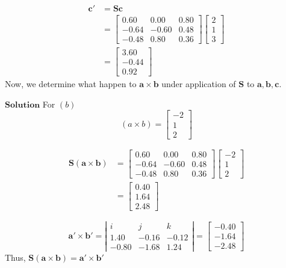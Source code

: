 $$
\begin{aligned}
\mathbf{c}' &=\mathbf{S} \mathbf{c} \\
&=\begin{bmatrix}
0.60 & 0.00 & 0.80 \\
-0.64 & -0.60 & 0.48 \\
-0.48 & 0.80 & 0.36
\end{bmatrix}\begin{bmatrix}
2 \\
1 \\
3
\end{bmatrix} \\
&=\begin{bmatrix}
3.60 \\
-0.44 \\
0.92
\end{bmatrix}
\end{aligned}
$$
Now, we determine what happen to $\mathbf{a} \times \mathbf{b}$ under application of $\mathbf{S}$ to $\mathbf{a}, \mathbf{b}, \mathbf{c}$.


$\boxed{\textbf{Solution}}$ For $(b)$
$$(a\times b)=\begin{bmatrix}
-2 \\
1 \\
2
\end{bmatrix}$$

$$
\begin{aligned}
\mathbf{S}(\mathbf{a} \times \mathbf{b}) &=\begin{bmatrix}
0.60 & 0.00 & 0.80 \\
-0.64 & -0.60 & 0.48 \\
-0.48 & 0.80 & 0.36
\end{bmatrix}\begin{bmatrix}
-2 \\
1 \\
2
\end{bmatrix} \\
&=\begin{bmatrix}
0.40 \\
1.64 \\
2.48
\end{bmatrix}
\end{aligned}
$$

$$
\mathbf{a}' \times \mathbf{b}'=\left|\begin{array}{ccc}
i & j & k \\
1.40 & -0.16 & -0.12 \\
-0.80 & -1.68 & 1.24
\end{array}\right|=\begin{bmatrix}
-0.40 \\
-1.64 \\
-2.48
\end{bmatrix}
$$
Thus, $\mathbf{S}(\mathbf{a} \times \mathbf{b})=\mathbf{a}' \times \mathbf{b}'$

